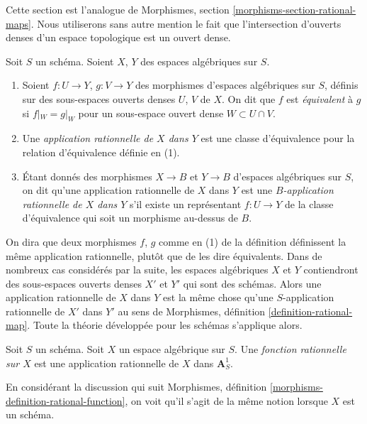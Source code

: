 \noindent
Cette section est l'analogue de
Morphismes, section \ref{morphisms-section-rational-maps}.
Nous utiliserons sans autre mention le fait que l'intersection d'ouverts denses
d'un espace topologique est un ouvert dense.

\begin{definition}
\label{definition-rational-map}
Soit $S$ un schéma. Soient $X$, $Y$ des espaces algébriques sur $S$.
\begin{enumerate}
\item Soient $f : U \to Y$, $g : V \to Y$ des morphismes d'espaces algébriques
sur $S$, définis sur des sous-espaces ouverts denses $U$, $V$ de $X$. On dit que $f$ est
{\it équivalent} à $g$ si $f|_W = g|_W$ pour un sous-espace ouvert dense
$W \subset U \cap V$.
\item Une {\it application rationnelle de $X$ dans $Y$}
est une classe d'équivalence pour la relation d'équivalence définie en (1).
\item Étant donnés des morphismes $X \to B$ et $Y \to B$ d'espaces algébriques sur $S$,
on dit qu'une application rationnelle de $X$ dans $Y$ est une
{\it $B$-application rationnelle de $X$ dans $Y$}
s'il existe un représentant $f : U \to Y$ de la classe d'équivalence
qui soit un morphisme au-dessus de $B$.
\end{enumerate}
\end{definition}

\noindent
On dira que deux morphismes $f$, $g$ comme en (1) de la définition
définissent la même application rationnelle, plutôt que de les dire équivalents.
Dans de nombreux cas considérés par la suite, les espaces algébriques
$X$ et $Y$ contiendront des sous-espaces ouverts denses $X'$ et $Y'$ qui
sont des schémas. Alors une application rationnelle de $X$ dans $Y$ est la même chose
qu'une $S$-application rationnelle de $X'$ dans $Y'$ au sens de
Morphismes, définition \ref{definition-rational-map}.
Toute la théorie développée pour les schémas s'applique alors.

\begin{definition}
\label{definition-rational-function}
Soit $S$ un schéma. Soit $X$ un espace algébrique sur $S$. Une
{\it fonction rationnelle sur $X$} est une application rationnelle de $X$ dans $\mathbf{A}^1_S$.
\end{definition}

\noindent
En considérant la discussion qui suit
Morphismes, définition \ref{morphisms-definition-rational-function},
on voit qu'il s'agit de la même notion lorsque
$X$ est un schéma.

